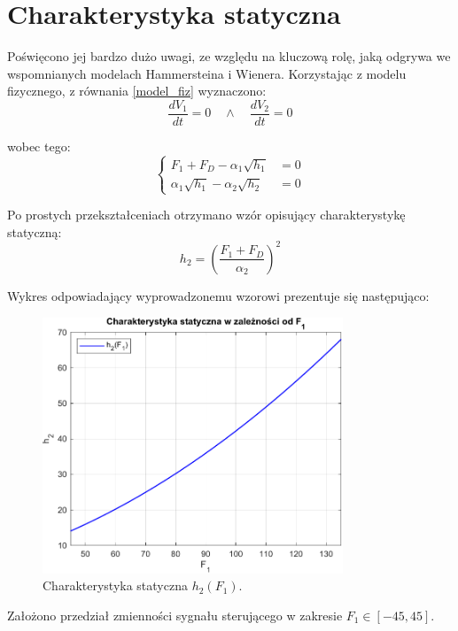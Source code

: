 \documentclass[a4paper,titlepage,11pt,floatssmall]{mwrep}
\begin{document}
\section{Charakterystyka statyczna}
Poświęcono jej bardzo dużo uwagi, ze względu na kluczową rolę, jaką odgrywa we wspomnianych modelach Hammersteina i Wienera. Korzystając z modelu fizycznego, z równania \ref{model_fiz} wyznaczono:
\begin{equation}
\frac{dV_1}{dt} = 0 \quad \wedge \quad \frac{dV_2}{dt} = 0
\end{equation}

\noindent wobec tego:
\begin{equation}
\begin{cases}
F_1 + F_D - \alpha_1 \sqrt{h_1} &= 0 \\
\alpha_1 \sqrt{h_1} - \alpha_2 \sqrt{h_2} &= 0
\end{cases}
\end{equation}

\noindent Po prostych przekształceniach otrzymano wzór opisujący charakterystykę statyczną:
\begin{equation}
h_2 = \left( \frac{F_1 + F_D}{\alpha_2} \right)^2
\end{equation}

\noindent Wykres odpowiadający wyprowadzonemu wzorowi prezentuje się następująco:

\begin{figure}[h!]
\centering
\includegraphics[width=0.8\textwidth]{pictures/static_characteristic}
\caption{Charakterystyka statyczna $h_2(F_1)$.}
\label{static_characteristic}
\end{figure}

\noindent Założono przedział zmienności sygnału sterującego w zakresie $F_1 \in [-45, 45]$.
\end{document}
